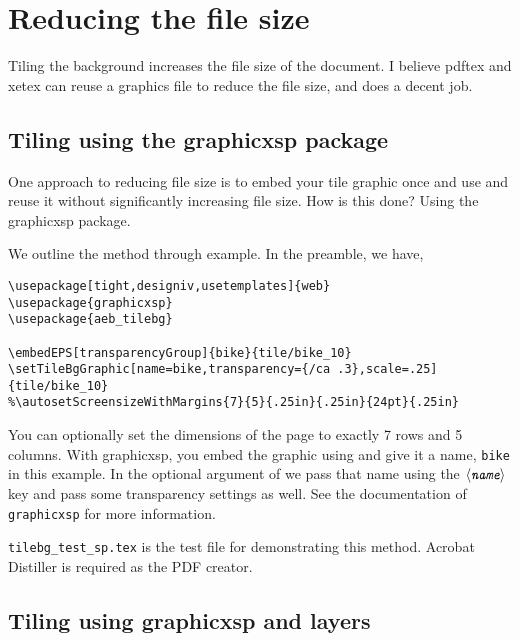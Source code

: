 \documentclass{article}
\def\meta#1{$\langle\textit{\texttt{#1}}\rangle$}
\let\amtIndent\leftmargini
\begin{document}
\section{Reducing the file size}

Tiling the background increases the file size of the document. I believe
pdftex and xetex can reuse a graphics file to reduce the file size, and
does a decent job.

\subsection{Tiling using the \textsf{graphicxsp} package}

One approach to reducing file size is to embed your tile graphic once and
use and reuse it without significantly increasing file size. How is this
done? Using the \textsf{graphicxsp} package.

We outline the method through example. In the preamble, we have,
\begin{Verbatim}[xleftmargin=\amtIndent,fontsize=\small,commandchars=!()]
\usepackage[tight,designiv,usetemplates]{web}
\usepackage{graphicxsp}
\usepackage{aeb_tilebg}

\embedEPS[transparencyGroup]{bike}{tile/bike_10}
\setTileBgGraphic[name=bike,transparency={/ca .3},scale=.25]{tile/bike_10}
%\autosetScreensizeWithMargins{7}{5}{.25in}{.25in}{24pt}{.25in}
\end{Verbatim}
You can optionally set the dimensions of the page to exactly 7 rows and 5
columns. With \textsf{graphicxsp}, you embed the graphic using
 and give it a name, \texttt{bike} in this example. In the
optional argument of  we pass that name using the
\meta{name} key and pass some transparency settings as well. See the
documentation of \texttt{graphicxsp} for more information.

 \texttt{tilebg\_test\_sp.tex} is the test file for
demonstrating this method. Acrobat Distiller is required as the PDF
creator.

\subsection{Tiling using \textsf{graphicxsp} and layers}
\end{document}
